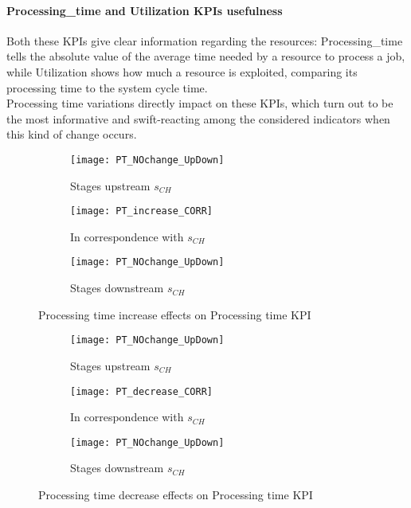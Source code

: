 \paragraph{Processing\_time and Utilization KPIs usefulness}
Both these KPIs give clear information regarding the resources: Processing\_time tells the absolute value of the average time needed by a resource to process a job, while Utilization shows how much a resource is exploited, comparing its processing time to the system cycle time.\\
Processing time variations directly impact on these KPIs, which turn out to be the most informative and swift-reacting among the considered indicators when this kind of change occurs.
\begin{landscape}
\begin{figure}[p]
  \centering
  \begin{subfigure}[t]{0.4\textwidth}
    \texttt{[image: PT\_NOchange\_UpDown]}
    \caption{Stages upstream $s_{CH}$}
    \label{fig:Processing time increase effects on Processing time KPI - Stages upstream}   
  \end{subfigure}
  \begin{subfigure}[t]{0.4\textwidth}
    \texttt{[image: PT\_increase\_CORR]}
    \caption{In correspondence with $s_{CH}$}
    \label{fig:Processing time increase effects on Processing time KPI - In correspondence with}   
  \end{subfigure}
  \begin{subfigure}[t]{0.4\textwidth}
    \texttt{[image: PT\_NOchange\_UpDown]}
    \caption{Stages downstream $s_{CH}$}
    \label{fig:Processing time increase effects on Processing time KPI - Stages downstream}   
  \end{subfigure}
  \caption{Processing time increase effects on Processing time KPI}
  \label{fig:Processing time increase effects on Processing time KPI}
\end{figure}
\begin{figure}[p]
  \centering
  \begin{subfigure}[b]{0.4\textwidth}
    \texttt{[image: PT\_NOchange\_UpDown]}
    \caption{Stages upstream $s_{CH}$}
    \label{fig:Processing time decrease effects on Processing time KPI - Stages upstream}   
  \end{subfigure}
  \begin{subfigure}[b]{0.4\textwidth}
    \texttt{[image: PT\_decrease\_CORR]}
    \caption{In correspondence with $s_{CH}$}
    \label{fig:Processing time decrease effects on Processing time KPI - In correspondence with}   
  \end{subfigure}
  \begin{subfigure}[b]{0.4\textwidth}
    \texttt{[image: PT\_NOchange\_UpDown]}
    \caption{Stages downstream $s_{CH}$}
    \label{fig:Processing time decrease effects on Processing time KPI - Stages downstream}   
  \end{subfigure}
  \caption{Processing time decrease effects on Processing time KPI}
  \label{fig:Processing time decrease effects on Processing time KPI}
\end{figure}
\end{landscape}
